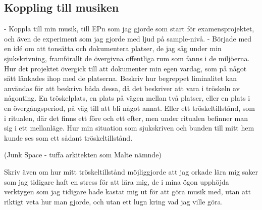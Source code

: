 \documentclass{article}
\begin{document}


\subsection{Koppling till musiken}
- Koppla till min musik, till EPn som jag gjorde som start för examensprojektet, och även de experiment som
  jag gjorde med ljud på sample-nivå. 
- Började med en idé om att tonsätta och dokumentera platser, de jag såg under min sjukskrivning, framförallt
  de övergivna offentliga rum som fanns i de miljöerna. Hur det projektet övergick till att dokumenter min
  egen vardag, som på något sätt länkades ihop med de platserna. Beskriv hur begreppet liminalitet kan
  användas för att beskriva båda dessa, då det beskriver att vara i tröskeln av någonting. En tröskelplats, en
  plats på vägen mellan två platser, eller en plats i en övergångsperiod, på väg till att bli något annat.
  Eller ett tröskeltillstånd, som i ritualen, där det finns ett före och ett efter, men under ritualen
  befinner man sig i ett mellanläge. Hur min situation som sjukskriven och bunden till mitt hem kunde ses som
  ett sådant tröskeltillstånd. 
  
  (Junk Space - tuffa arkitekten som Malte nämnde)

  Skriv även om hur mitt tröskeltillstånd möjliggjorde att jag orkade lära mig saker som jag tidigare haft en
  stress för att lära mig, de i mina ögon upphöjda verktygen som jag tidigare hade kastat mig ut för att göra
  musik med, utan att riktigt veta hur man gjorde, och utan ett lugn kring vad jag ville göra.
\end{document}
